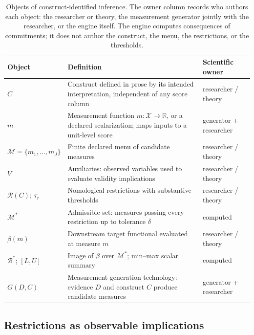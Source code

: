 \documentclass[10pt,letterpaper]{article}
\newcommand{\M}{\ensuremath{\mathcal{M}}}
\newcommand{\Rset}{\mathcal{R}}
\newcommand{\Bset}{\mathcal{B}}
\begin{document}
\begin{table}[t]
\centering
\small
\caption{Objects of construct-identified inference.
The owner column records who authors each object: the researcher or theory, the measurement generator jointly with the researcher, or the engine itself.
The engine computes consequences of commitments; it does not author the construct, the menu, the restrictions, or the thresholds.}
\label{tab:objects}
\begin{tabularx}{\textwidth}{@{}>{\raggedright\arraybackslash}p{2.6cm} X >{\raggedright\arraybackslash}p{2.7cm}@{}}
\toprule
\textbf{Object} & \textbf{Definition} & \textbf{Scientific owner} \\
\midrule
$C$ & Construct defined in prose by its intended interpretation, independent of any score column & researcher / theory \\
$m$ & Measurement function $m:\mathcal{X}\to\mathbb{R}$, or a declared scalarization; maps inputs to a unit-level score & generator + researcher \\
$\M=\{m_1,\ldots,m_J\}$ & Finite declared menu of candidate measures & researcher / theory \\
$V$ & Auxiliaries: observed variables used to evaluate validity implications & researcher / theory \\
$\Rset(C)$; $\tau_r$ & Nomological restrictions with substantive thresholds & researcher / theory \\
$\M^*$ & Admissible set: measures passing every restriction up to tolerance $\delta$ & computed \\
$\beta(m)$ & Downstream target functional evaluated at measure $m$ & researcher / theory \\
$\Bset^*$; $[L,U]$ & Image of $\beta$ over $\M^*$; min--max scalar summary & computed \\
$G(D,C)$ & Measurement-generation technology: evidence $D$ and construct $C$ produce candidate measures & generator + researcher \\
\bottomrule
\end{tabularx}
\end{table}

\subsection{Restrictions as observable implications}
\label{sec:restrictions}
\end{document}
